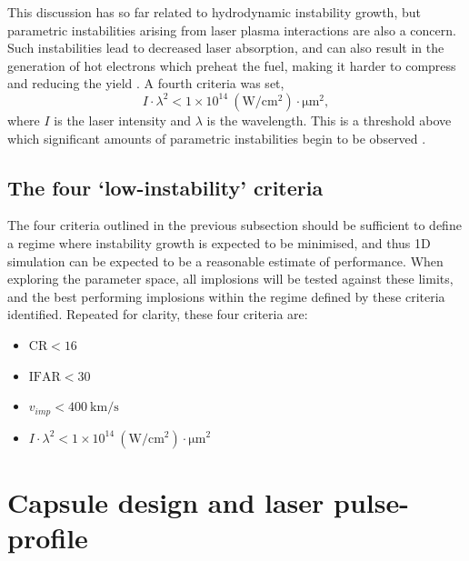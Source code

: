This discussion has so far related to hydrodynamic instability growth, but parametric instabilities arising from laser plasma interactions are also a concern. Such instabilities lead to decreased laser absorption, and can also result in the generation of hot electrons which preheat the fuel, making it harder to compress and reducing the yield \cite{Rosenberg2018, Yaakobi2000}. A fourth criteria was set,
\begin{equation} I \cdot \lambda^2 < 1 \times 10^{14} \: (\unit{\watt\per\centi\meter\squared}) \cdot \unit{\micro\meter\squared}, \end{equation}
where $I$ is the laser intensity and $\lambda$ is the wavelength. This is a threshold above which significant amounts of parametric instabilities begin to be observed \cite{Montgomery2016}.

\subsection{The four `low-instability' criteria}
The four criteria outlined in the previous subsection should be sufficient to define a regime where instability growth is expected to be minimised, and thus 1D simulation can be expected to be a reasonable estimate of performance. When exploring the parameter space, all implosions will be tested against these limits, and the best performing implosions within the regime defined by these criteria identified. Repeated for clarity, these four criteria are:
\begin{itemize}
    \item $\textrm{CR} < 16$
    \item $\textrm{IFAR} < 30$
    \item $v_{imp} < 400 \: \unit{\kilo\meter\per\second}$
    \item $I \cdot \lambda^2 < 1 \times 10^{14} \: (\unit{\watt\per\centi\meter\squared}) \cdot \unit{\micro\meter\squared}$
\end{itemize}



\section{Capsule design and laser pulse-profile}

